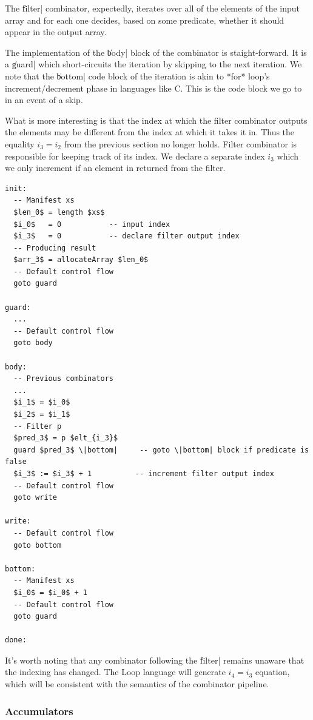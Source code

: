 \documentclass[preamble.tex]{subfiles}
\begin{document}
The \|filter| combinator, expectedly, iterates over all of the elements of the input array and for each one decides, based on some predicate, whether it should appear in the output array.

The implementation of the \|body| block of the combinator is staight-forward. It is a \|guard| which short-circuits the iteration by skipping to the next iteration. We note that the \|bottom| code block of the iteration is akin to *for* loop's increment/decrement phase in languages like C. This is the code block we go to in an event of a skip.

What is more interesting is that the index at which the filter combinator outputs the elements may be different from the index at which it takes it in. Thus the equality $i_3 = i_2$ from the previous section no longer holds. Filter combinator is responsible for keeping track of its index. We declare a separate index $i_3$ which we only increment if an element in returned from the filter.

\begin{lstlisting}[mathescape]
init:
  -- Manifest xs
  $len_0$ = length $xs$
  $i_0$   = 0           -- input index
  $i_3$   = 0           -- declare filter output index
  -- Producing result
  $arr_3$ = allocateArray $len_0$
  -- Default control flow
  goto guard

guard:
  ...
  -- Default control flow
  goto body

body:
  -- Previous combinators
  ...
  $i_1$ = $i_0$
  $i_2$ = $i_1$
  -- Filter p
  $pred_3$ = p $elt_{i_3}$
  guard $pred_3$ \|bottom|     -- goto \|bottom| block if predicate is false
  $i_3$ := $i_3$ + 1          -- increment filter output index
  -- Default control flow
  goto write

write:
  -- Default control flow
  goto bottom

bottom:
  -- Manifest xs
  $i_0$ = $i_0$ + 1
  -- Default control flow
  goto guard

done:

\end{lstlisting}


It's worth noting that any combinator following the \|filter| remains unaware that the indexing has changed. The Loop language will generate $i_4 = i_3$ equation, which will be consistent with the semantics of the combinator pipeline.



\subsubsection{Accumulators}
\end{document}
